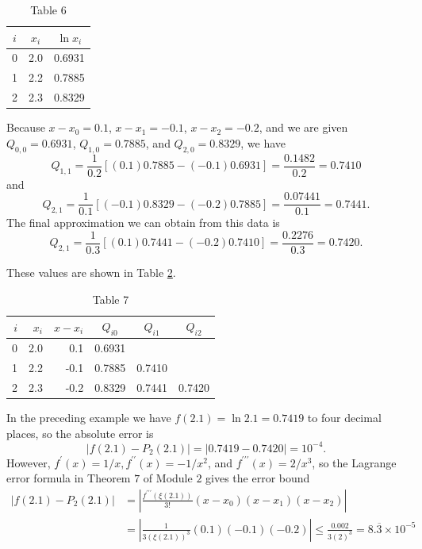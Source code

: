\begin{table}
\centering
\begin{tabular}{ccc}
\hline
$i$ & $x_{i}$ & $\ln x_{i}$ \\
\hline
0 & 2.0 & 0.6931 \\
1 & 2.2 & 0.7885 \\
2 & 2.3 & 0.8329 \\
\hline
\end{tabular}
\caption{\scriptsize Table 6}
\label{tab:dataexample3}
\end{table}
%
%
\begin{mysolution}
Because $x-x_0 =0.1$, $x-x_1 =-0.1$, $x−x_2 =-0.2$, and we are given $Q_{0,0}=0.6931$, $Q_{1,0}=0.7885$, and $Q_{2,0}=0.8329$, we have
\[Q_{1,1}=\frac{1}{0.2}[(0.1)0.7885-(-0.1)0.6931]=\frac{0.1482}{0.2}=0.7410\]
and
\[Q_{2,1}=\frac{1}{0.1}[(-0.1) 0.8329-(-0.2) 0.7885]=\frac{0.07441}{0.1}=0.7441.\]
The final approximation we can obtain from this data is
\[Q_{2,1}=\frac{1}{0.3}[(0.1) 0.7441-(-0.2) 0.7410]=\frac{0.2276}{0.3}=0.7420.\]

These values are shown in Table \ref{tab:datasolnexample3}.
\end{mysolution}

\begin{table}
\centering
\begin{tabular}{rrrccc}
\hline
$i$ & $x_{i}$ & $x-x_{i}$ & $Q_{i 0}$ & $Q_{i 1}$ & $Q_{i 2}$ \\
\hline
0 & 2.0 & 0.1 & 0.6931 &  &  \\
1 & 2.2 & -0.1 & 0.7885 & 0.7410 &  \\
2 & 2.3 & -0.2 & 0.8329 & 0.7441 & 0.7420 \\
\hline
\end{tabular}
\caption{\scriptsize Table 7}
\label{tab:datasolnexample3}
\end{table}

In the preceding example we have $f(2.1)=\ln 2.1=0.7419$ to four decimal places, so the absolute error is
\[\left|f(2.1)-P_{2}(2.1)\right|=|0.7419-0.7420|=10^{-4}.\]
However, $f^{\prime}(x)=1 / x, f^{\prime \prime}(x)=-1 / x^{2}$, and $f^{\prime \prime \prime}(x)=2 / x^{3}$, so the Lagrange error formula in Theorem $7$ of Module $2$ gives the error bound
\[\begin{aligned}
\left|f(2.1)-P_{2}(2.1)\right| & =\left|\frac{f^{\prime \prime \prime}(\xi(2.1))}{3!}\left(x-x_{0}\right)\left(x-x_{1}\right)\left(x-x_{2}\right)\right| \\
& =\left|\frac{1}{3(\xi(2.1))^{3}}(0.1)(-0.1)(-0.2)\right| \leq \frac{0.002}{3(2)^{3}}=8 . \overline{3} \times 10^{-5}
\end{aligned}\]

